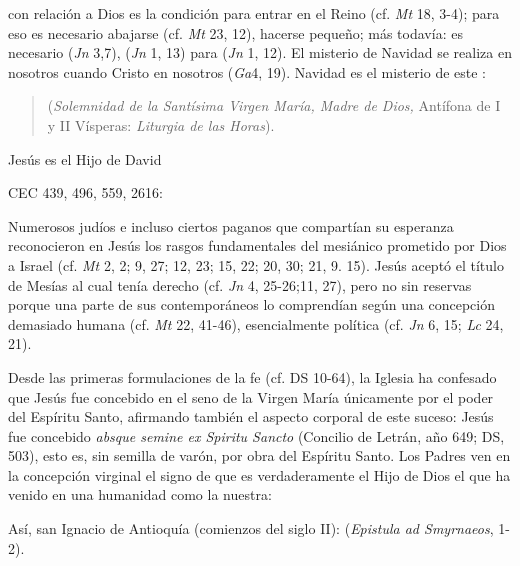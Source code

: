 	
	
	  con relación a Dios es la condición para entrar en el Reino (cf. \emph{Mt} 18, 3-4); para eso es necesario abajarse (cf. \emph{Mt} 23, 12), hacerse pequeño; más todavía: es necesario  (\emph{Jn} 3,7),  (\emph{Jn} 1, 13) para  (\emph{Jn} 1, 12). El misterio de Navidad se realiza en nosotros cuando Cristo  en nosotros (\emph{Ga}4, 19). Navidad es el misterio de este :
	
	\begin{quote}
		 (\emph{Solemnidad de la Santísima Virgen María, Madre de Dios,} Antífona de I y II Vísperas: \emph{Liturgia de las Horas}).
	\end{quote}
	
	
	
	Jesús es el Hijo de David
	
	CEC 439, 496, 559, 2616:
	
	 Numerosos judíos e incluso ciertos paganos que compartían su esperanza reconocieron en Jesús los rasgos fundamentales del mesiánico  prometido por Dios a Israel (cf. \emph{Mt} 2, 2; 9, 27; 12, 23; 15, 22; 20, 30; 21, 9. 15). Jesús aceptó el título de Mesías al cual tenía derecho (cf. \emph{Jn} 4, 25-26;11, 27), pero no sin reservas porque una parte de sus contemporáneos lo comprendían según una concepción demasiado humana (cf. \emph{Mt} 22, 41-46), esencialmente política (cf. \emph{Jn} 6, 15; \emph{Lc} 24, 21).
	
	
	 Desde las primeras formulaciones de la fe (cf. DS 10-64), la Iglesia ha confesado que Jesús fue concebido en el seno de la Virgen María únicamente por el poder del Espíritu Santo, afirmando también el aspecto corporal de este suceso: Jesús fue concebido \emph{absque semine ex Spiritu Sancto} (Concilio de Letrán, año 649; DS, 503), esto es, sin semilla de varón, por obra del Espíritu Santo. Los Padres ven en la concepción virginal el signo de que es verdaderamente el Hijo de Dios el que ha venido en una humanidad como la nuestra:
	
	Así, san Ignacio de Antioquía (comienzos del siglo II):  (\emph{Epistula ad Smyrnaeos}, 1-2).
	
